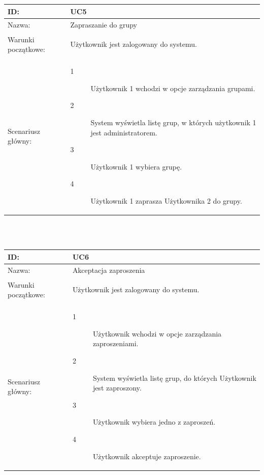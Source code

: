\documentclass[11pt,a4paper,polish,thesis]{dcsbook}
\begin{document}
\\\\ \begin{tabular}{|p{2.5cm}|p{11.5cm}|}  \hline ID: &
UC5
\\ \hline Nazwa: &
Zapraszanie do grupy
\\ \hline Warunki początkowe: &
\begin{description}
\item Użytkownik jest zalogowany do systemu.
\end{description}
\\ \hline Scenariusz główny: &
\begin{description}
\item[1] Użytkownik 1 wchodzi w opcje zarządzania grupami.
\item[2] System wyświetla listę grup, w których użytkownik 1 jest administratorem.
\item[3] Użytkownik 1 wybiera grupę.
\item[4] Użytkownik 1 zaprasza Użytkownika 2 do grupy.
\end{description}
\\ \hline \end{tabular}
\\\\ \begin{tabular}{|p{2.5cm}|p{11.5cm}|}  \hline ID: &
UC6
\\ \hline Nazwa: &
Akceptacja zaproszenia
\\ \hline Warunki początkowe: &
\begin{description}
\item Użytkownik jest zalogowany do systemu.
\end{description}
\\ \hline Scenariusz główny: &
\begin{description}
\item[1] Użytkownik wchodzi w opcje zarządzania zaproszeniami.
\item[2] System wyświetla listę grup, do których Użytkownik jest zaproszony.
\item[3] Użytkownik wybiera jedno z zaproszeń.
\item[4] Użytkownik akceptuje zaproszenie.
\end{description}
\\ \hline \end{tabular}
\end{document}

